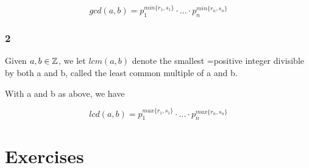 \documentclass[12pt]{article} %
\begin{document}
$$
    gcd(a, b) = p_{1}^{min\{r_1, s_1\}} \cdot ... \cdot p_{n}^{min\{r_n, s_n\}}
$$

\subsubsection*{2}

Given $a, b \in \mathbb{Z}$, we let $lcm(a, b)$ denote the smallest =positive integer divisible by both a and b, called the least common multiple of a and b.

With a and b as above, we have

$$
    lcd(a, b) = p_{1}^{max\{r_1, s_1\}} \cdot ... \cdot p_{n}^{max\{r_n, s_n\}}
$$

\pagebreak


\section{Exercises}
\end{document}
